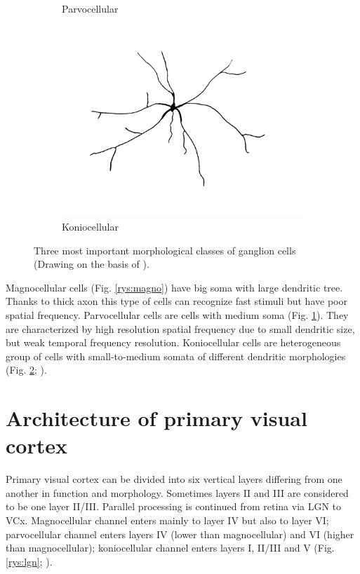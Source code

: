 \documentclass{pracalicmgr}
\begin{document}
\begin{figure}[H]
\begin{subfigure}{.33\textwidth}
   		\caption{Parvocellular}
   		\label{rys:parvo}
   	\end{subfigure}
   	\begin{subfigure}{.33\textwidth}
   		\centering
   		\includegraphics[width=1\linewidth]{cell_K2.png}
   		\caption{Koniocellular}
   		\label{rys:konio}
   	\end{subfigure}
   	\caption{Three most important morphological classes of ganglion cells  (Drawing on the basis of \cite{parallel}).}
   	\label{rys:ganglio}
   \end{figure}
   Magnocellular cells (Fig. \ref{rys:magno}) have big soma with large dendritic tree. Thanks to thick axon this type of cells can recognize fast stimuli but have poor spatial frequency. Parvocellular cells are cells with medium soma (Fig. \ref{rys:parvo}). They are characterized by high resolution spatial frequency due to small dendritic size, but weak temporal frequency resolution. Koniocellular cells are heterogeneous group of cells with small-to-medium somata of different dendritic morphologies (Fig. \ref{rys:konio}; \cite{parallel, viola}). 
   
   
   \section{Architecture of primary visual cortex}
   Primary visual cortex can be divided into six vertical layers differing from one another in function and morphology. Sometimes layers II and III are considered to be one layer II/III. Parallel processing is continued from retina via LGN to VCx. Magnocellular channel enters mainly to layer IV but also to layer VI; parvocellular channel enters layers IV (lower than magnocellular) and VI (higher than magnocellular); koniocellular channel enters layers I, II/III and V (Fig. \ref{rys:lgn}; \cite{parallel}).
   
\end{document}
